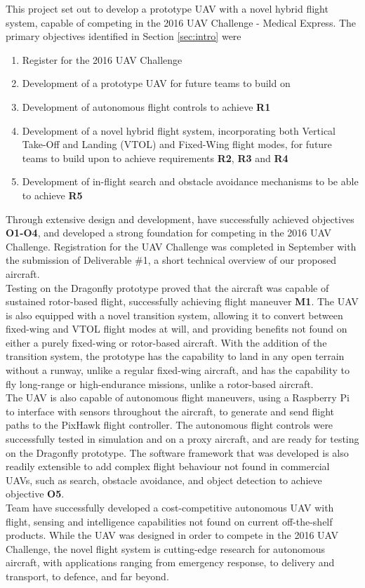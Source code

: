This project set out to develop a prototype UAV with a novel hybrid flight system, capable of competing in the 2016 UAV Challenge - Medical Express. The primary objectives identified in Section \ref{sec:intro} were
\begin{enumerate}[label=\bfseries O\arabic*:] \itemsep-2pt
	\item Register for the 2016 UAV Challenge
	\item Development of a prototype UAV for future teams to build on
	\item Development of autonomous flight controls to achieve \textbf{R1}
	\item Development of a novel hybrid flight system, incorporating both Vertical Take-Off and Landing (VTOL) and Fixed-Wing flight modes, for future teams to build upon to achieve requirements \textbf{R2}, \textbf{R3} and \textbf{R4}
	\item Development of in-flight search and obstacle avoidance mechanisms to be able to achieve \textbf{R5}
\end{enumerate}

Through extensive design and development, \ID have successfully achieved objectives \textbf{O1-O4}, and developed a strong foundation for competing in the 2016 UAV Challenge. Registration for the UAV Challenge was completed in September with the submission of Deliverable \#1, a short technical overview of our proposed aircraft.\\

Testing on the Dragonfly prototype proved that the aircraft was capable of sustained rotor-based flight, successfully achieving flight maneuver \textbf{M1}. The UAV is also equipped with a novel transition system, allowing it to convert between fixed-wing and VTOL flight modes at will, and providing benefits not found on either a purely fixed-wing or rotor-based aircraft. With the addition of the transition system, the prototype has the capability to land in any open terrain without a runway, unlike a regular fixed-wing aircraft, and has the capability to fly long-range or high-endurance missions, unlike a rotor-based aircraft.\\

The UAV is also capable of autonomous flight maneuvers, using a Raspberry Pi to interface with sensors throughout the aircraft, to generate and send flight paths to the PixHawk flight controller. The autonomous flight controls were successfully tested in simulation and on a proxy aircraft, and are ready for testing on the Dragonfly prototype. The software framework that was developed is also readily extensible to add complex flight behaviour not found in commercial UAVs, such as search, obstacle avoidance, and object detection to achieve objective \textbf{O5}.\\

Team \ID have successfully developed a cost-competitive autonomous UAV with flight, sensing and intelligence capabilities not found on current off-the-shelf products. While the UAV was designed in order to compete in the 2016 UAV Challenge, the novel flight system is cutting-edge research for autonomous aircraft, with applications ranging from emergency response, to delivery and transport, to defence, and far beyond.